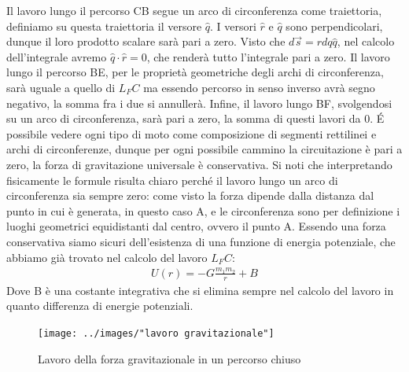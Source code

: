 \documentclass[10pt,a4paper]{article}
\begin{document}
Il lavoro lungo il percorso CB segue un arco di circonferenza come traiettoria, definiamo su questa traiettoria il versore $\hat{q}$. I versori $\hat{r}$ e $\hat{q}$ sono perpendicolari, dunque il loro prodotto scalare sarà pari a zero. Visto che $d\vec{s} = r dq \hat{q}$, nel calcolo dell'integrale avremo $\hat{q} \cdot \hat{r}= 0$, che renderà tutto l'integrale pari a zero. Il lavoro lungo il percorso BE, per le proprietà geometriche degli archi di circonferenza, sarà uguale a quello di $L_FC$ ma essendo percorso in senso inverso avrà segno negativo, la somma fra i due si annullerà. Infine, il lavoro lungo BF, svolgendosi su un arco di circonferenza, sarà pari a zero, la somma di questi lavori da 0. \'{E} possibile vedere ogni tipo di moto come composizione di segmenti rettilinei e archi di circonferenze, dunque per ogni possibile cammino la circuitazione è pari a zero, la forza di gravitazione universale è conservativa. Si noti che interpretando fisicamente le formule risulta chiaro perché il lavoro lungo un arco di circonferenza sia sempre zero: come visto la forza dipende dalla distanza dal punto in cui è generata, in questo caso A, e le circonferenza sono per definizione i luoghi geometrici equidistanti dal centro, ovvero il punto A.
Essendo una forza conservativa siamo sicuri dell'esistenza di una funzione di energia potenziale, che abbiamo già trovato nel calcolo del lavoro $L_FC$: 
\begin{align*}
	U(r) = -G\frac{m_1m_2}{r}+B
\end{align*}
Dove B è una costante integrativa che si elimina sempre nel calcolo del lavoro in quanto differenza di energie potenziali. \\
\begin{figure}[h!]
	\centering
	\texttt{[image: ../images/"lavoro gravitazionale"]}
	\caption{Lavoro della forza gravitazionale in un percorso chiuso}
	\label{fig:lavoro-gravitazionale}
\end{figure}
\FloatBarrier
\newpage
\end{document}

